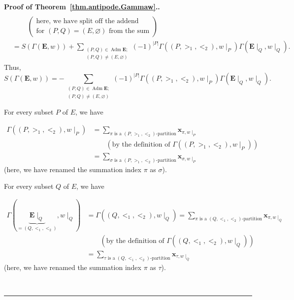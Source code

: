 \documentclass[numbers=enddot,12pt,final,onecolumn,notitlepage,abstracton]{scrartcl}
\theoremstyle{definition}
\newenvironment{proof}[1][Proof]{\noindent\textbf{#1.} }{\ \rule{0.5em}{0.5em}}
\let\sumnonlimits\sum
\renewcommand{\sum}{\sumnonlimits\limits}
\newenvironment{verlong}{}{}
\newcommand{\xx}{{\mathbf{x}}}
\newcommand{\Adm}{\operatorname{Adm}}
\newcommand{\EE}{{\mathbf{E}}}
\begin{document}
\begin{proof}[Proof of Theorem~\ref{thm.antipode.Gammaw}.]
\begin{verlong}
\begin{align}
     \nonumber \\
& \ \ \ \ \ \ \ \ \ \ \left( \begin{array}{c}
  \text{here, we have split off the addend } \\
  \text{for } \left(P, Q\right) = \left(E, \varnothing\right)
  \text{ from the sum}
  \end{array} \right) \nonumber \\
& = S\left(\Gamma\left(\EE, w\right)\right)
  + \sum_{\substack{\left(P, Q\right) \in \Adm \EE ; \\
                    \left(P, Q\right) \neq \left(E, \varnothing\right)}}
  \left(-1\right)^{\left|P\right|}
  \Gamma\left(\left(P, >_1, <_2\right), w\mid_P\right)
  \Gamma\left(\EE\mid_Q, w\mid_Q\right) .
\nonumber
\end{align}
Thus,
\begin{equation}
S\left(\Gamma\left(\EE, w\right)\right)
= - \sum_{\substack{\left(P, Q\right) \in \Adm \EE ; \\
                    \left(P, Q\right) \neq \left(E, \varnothing\right)}}
\left(-1\right)^{\left|P\right|}
\Gamma\left(\left(P, >_1, <_2\right), w\mid_P\right)
\Gamma\left(\EE\mid_Q, w\mid_Q\right) .
\label{pf.thm.antipode.Gammaw.Seq}
\end{equation}
\end{verlong}

For every subset $P$ of $E$, we have

\begin{align}
\Gamma\left(\left(P, >_1, <_2\right), w\mid_P\right)
&= \sum_{\pi \text{ is a }\left(P, >_1, <_2\right)\text{-partition}}
\xx_{\pi, w\mid_P}
\nonumber \\
& \qquad \left(\text{by the definition of }
 \Gamma\left(\left(P, >_1, <_2\right), w\mid_P\right) \right)
\nonumber \\
& = \sum_{\sigma \text{ is a }\left(P, >_1, <_2\right)\text{-partition}}
\xx_{\sigma, w\mid_P}
\label{pf.thm.antipode.Gammaw.Req.pf.Gamma1}
\end{align}
(here, we have renamed the summation index $\pi$ as
$\sigma$).

For every subset $Q$ of $E$, we have

\begin{align}
\Gamma\left(\underbrace{\EE\mid_Q}_{=\left(Q, <_1, <_2\right)}, w\mid_Q\right)
&= \Gamma\left(\left(Q, <_1, <_2\right), w\mid_Q\right)
\nonumber 
= \sum_{\pi \text{ is a }\left(Q, <_1, <_2\right)\text{-partition}}
\xx_{\pi, w\mid_Q}
\nonumber \\
& \qquad \left(\text{by the definition of }
 \Gamma\left(\left(Q, <_1, <_2\right), w\mid_Q\right) \right)
\nonumber \\
& = \sum_{\tau \text{ is a }\left(Q, <_1, <_2\right)\text{-partition}}
\xx_{\tau, w\mid_Q}
\label{pf.thm.antipode.Gammaw.Req.pf.Gamma2}
\end{align}
(here, we have renamed the summation index $\pi$ as
$\tau$).


\end{proof}
\end{document}
